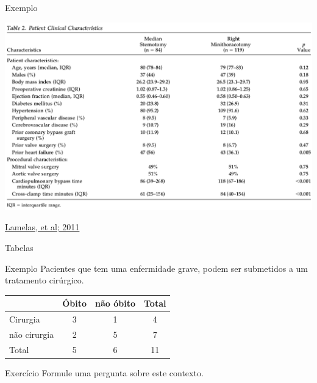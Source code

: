 \documentclass{beamer}
\begin{document}
\begin{frame}
  \begin{exampleblock}{Exemplo}
    \begin{center}
      \includegraphics[width=.9\textwidth]{EDA/eda-tabela}
    \end{center}
  \end{exampleblock}

  \vfill
  \tiny
  \hfill \href{https://doi.org/10.1016/j.athoracsur.2010.09.019}{Lamelas, et al; 2011}
\end{frame}

\begin{frame}{Tabelas}
  \begin{exampleblock}{Exemplo}
    \scriptsize
    Pacientes que tem uma enfermidade grave, podem ser submetidos a um tratamento cirúrgico.

    \bigskip
    \begin{center}
    \begin{tabular}{l|cc|c}
      &Óbito & não óbito & Total\\
      \hline
      Cirurgia & 3 & 1 & 4 \\
      não cirurgia & 2 & 5 & 7\\
      \hline
      Total & 5 & 6 & 11
    \end{tabular}
    \end{center}
  \end{exampleblock}

  \bigskip
  \begin{block}{Exercício}
    Formule uma pergunta sobre este contexto.
  \end{block}
\end{frame}

\end{document}
